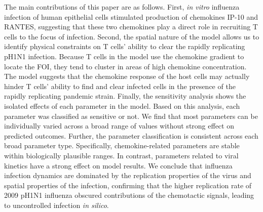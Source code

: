 \documentclass[10pt]{article}
\begin{document}

{\color{dkblue}The main contributions of this paper are as follows.  First, \textit{in vitro} influenza infection of human epithelial cells stimulated production of chemokines IP-10 and RANTES, suggesting that these two chemokines play a direct role in recruiting T cells to the focus of infection.  Second, the spatial nature of the model allows us to identify physical constraints on T cells' ability to clear the rapidly replicating pH1N1 infection.  Because T cells in the model use the chemokine gradient to locate the FOI, they tend to cluster in areas of high chemokine concentration.  The model suggests that the chemokine response of the host cells may actually hinder T cells' ability to find and clear infected cells in the presence of the rapidly replicating pandemic strain.  Finally, the sensitivity analysis shows the isolated effects of each parameter in the model.  Based on this analysis, each parameter was classified as sensitive or not.  We find that most parameters can be individually varied across a broad range of values without strong effect on predicted outcomes.  Further, the parameter classification is consistent across each broad parameter type. Specifically, chemokine-related parameters are stable within biologically plausible ranges.  In contrast, parameters related to viral kinetics have a strong effect on model results.  We conclude that influenza infection dynamics are dominated by the replication properties of the virus and spatial properties of the infection, confirming that the higher replication rate of 2009 pH1N1 influenza obscured contributions of the chemotactic signals, leading to uncontrolled infection \textit{in silico}.}



\end{document}
